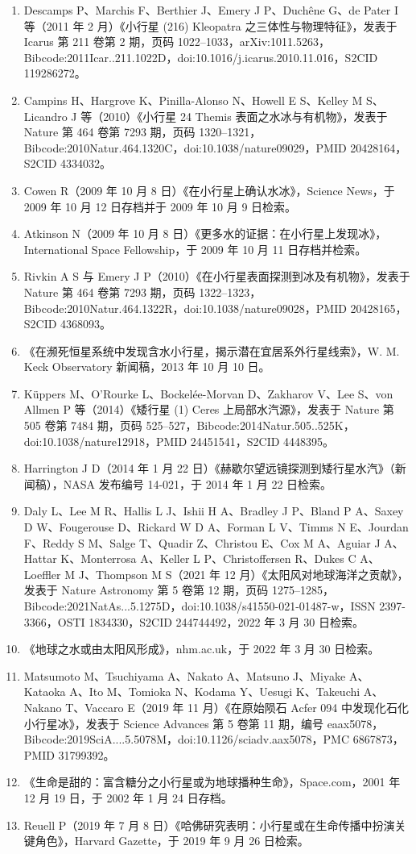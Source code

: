 \begin{enumerate}
\item Descamps P、Marchis F、Berthier J、Emery J P、Duchêne G、de Pater I 等（2011 年 2 月）《小行星 (216) Kleopatra 之三体性与物理特征》，发表于 Icarus 第 211 卷第 2 期，页码 1022–1033，arXiv:1011.5263，Bibcode:2011Icar..211.1022D，doi:10.1016/j.icarus.2010.11.016，S2CID 119286272。
\item Campins H、Hargrove K、Pinilla-Alonso N、Howell E S、Kelley M S、Licandro J 等（2010）《小行星 24 Themis 表面之水冰与有机物》，发表于 Nature 第 464 卷第 7293 期，页码 1320–1321，Bibcode:2010Natur.464.1320C，doi:10.1038/nature09029，PMID 20428164，S2CID 4334032。
\item Cowen R（2009 年 10 月 8 日）《在小行星上确认水冰》，Science News，于 2009 年 10 月 12 日存档并于 2009 年 10 月 9 日检索。
\item Atkinson N（2009 年 10 月 8 日）《更多水的证据：在小行星上发现冰》，International Space Fellowship，于 2009 年 10 月 11 日存档并检索。
\item Rivkin A S 与 Emery J P（2010）《在小行星表面探测到冰及有机物》，发表于 Nature 第 464 卷第 7293 期，页码 1322–1323，Bibcode:2010Natur.464.1322R，doi:10.1038/nature09028，PMID 20428165，S2CID 4368093。
\item 《在濒死恒星系统中发现含水小行星，揭示潜在宜居系外行星线索》，W. M. Keck Observatory 新闻稿，2013 年 10 月 10 日。
\item Küppers M、O'Rourke L、Bockelée-Morvan D、Zakharov V、Lee S、von Allmen P 等（2014）《矮行星 (1) Ceres 上局部水汽源》，发表于 Nature 第 505 卷第 7484 期，页码 525–527，Bibcode:2014Natur.505..525K，doi:10.1038/nature12918，PMID 24451541，S2CID 4448395。
\item Harrington J D（2014 年 1 月 22 日）《赫歇尔望远镜探测到矮行星水汽》（新闻稿），NASA 发布编号 14-021，于 2014 年 1 月 22 日检索。
\item Daly L、Lee M R、Hallis L J、Ishii H A、Bradley J P、Bland P A、Saxey D W、Fougerouse D、Rickard W D A、Forman L V、Timms N E、Jourdan F、Reddy S M、Salge T、Quadir Z、Christou E、Cox M A、Aguiar J A、Hattar K、Monterrosa A、Keller L P、Christoffersen R、Dukes C A、Loeffler M J、Thompson M S（2021 年 12 月）《太阳风对地球海洋之贡献》，发表于 Nature Astronomy 第 5 卷第 12 期，页码 1275–1285，Bibcode:2021NatAs...5.1275D，doi:10.1038/s41550-021-01487-w，ISSN 2397-3366，OSTI 1834330，S2CID 244744492，2022 年 3 月 30 日检索。
\item 《地球之水或由太阳风形成》，nhm.ac.uk，于 2022 年 3 月 30 日检索。
\item Matsumoto M、Tsuchiyama A、Nakato A、Matsuno J、Miyake A、Kataoka A、Ito M、Tomioka N、Kodama Y、Uesugi K、Takeuchi A、Nakano T、Vaccaro E（2019 年 11 月）《在原始陨石 Acfer 094 中发现化石化小行星冰》，发表于 Science Advances 第 5 卷第 11 期，编号 eaax5078，Bibcode:2019SciA....5.5078M，doi:10.1126/sciadv.aax5078，PMC 6867873，PMID 31799392。
\item 《生命是甜的：富含糖分之小行星或为地球播种生命》，Space.com，2001 年 12 月 19 日，于 2002 年 1 月 24 日存档。
\item Reuell P（2019 年 7 月 8 日）《哈佛研究表明：小行星或在生命传播中扮演关键角色》，Harvard Gazette，于 2019 年 9 月 26 日检索。



\end{enumerate}

